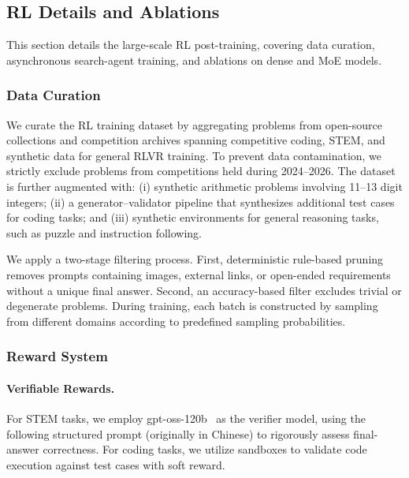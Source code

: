 \vspace{-1.5cm}

\subsection{RL Details and Ablations}
This section details the large-scale RL post-training, covering data curation, asynchronous search-agent training, and ablations on dense and MoE models.

\vspace{-0.5cm}
\subsubsection{Data Curation}
We curate the RL training dataset by aggregating problems from open-source collections and competition archives spanning competitive coding, STEM, and synthetic data for general RLVR training.
To prevent data contamination, we strictly exclude problems from competitions held during 2024–2026. The dataset is further augmented with:
(i) synthetic arithmetic problems involving 11–13 digit integers;
(ii) a generator–validator pipeline that synthesizes additional test cases for coding tasks; and
(iii) synthetic environments for general reasoning tasks, such as puzzle and instruction following.

We apply a two-stage filtering process. First, deterministic rule-based pruning removes prompts containing images, external links, or open-ended requirements without a unique final answer. Second, an accuracy-based filter excludes trivial or degenerate problems. During training, each batch is constructed by sampling from different domains according to predefined sampling probabilities.

\subsubsection{Reward System}
\label{sec:rl_reward}

\paragraph{Verifiable Rewards.}


For STEM tasks, we employ gpt-oss-120b~\cite{openai2025gptoss120bgptoss20bmodel} as the verifier model, using the following structured prompt (originally in Chinese) to rigorously assess final-answer correctness. For coding tasks, we utilize sandboxes to validate code execution against test cases with soft reward.


